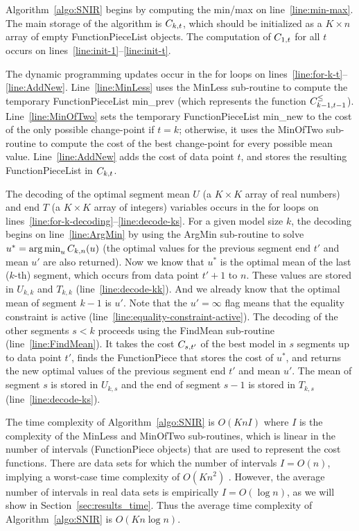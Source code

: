 \documentclass{article}
\DeclareMathOperator*{\argmin}{arg\,min}
\begin{document}
Algorithm~\ref{algo:SNIR} begins by computing the min/max on
line~\ref{line:min-max}.  The main storage of the algorithm is
$C_{k,t}$, which should be initialized as a $K\times n$ array of
empty FunctionPieceList objects. The computation of $C_{1,t}$ for
all $t$ occurs on lines~\ref{line:init-1}--\ref{line:init-t}. 

The dynamic programming updates occur in the for loops on
lines~\ref{line:for-k-t}--\ref{line:AddNew}. Line~\ref{line:MinLess}
uses the MinLess sub-routine to compute the temporary
FunctionPieceList min\_prev (which represents the function
$C_{k-1,t-1}^\leq$). Line~\ref{line:MinOfTwo} sets the temporary
FunctionPieceList min\_new to the cost of the only possible
change-point if $t=k$; otherwise, it uses the MinOfTwo sub-routine to
compute the cost of the best change-point for every possible mean
value. Line~\ref{line:AddNew} adds the cost of data point $t$, and
stores the resulting FunctionPieceList in $C_{k,t}$.

The decoding of the optimal segment mean $U$ (a $K\times K$ array of
real numbers) and end $T$ (a $K\times K$ array of integers) variables
occurs in the for loops on
lines~\ref{line:for-k-decoding}--\ref{line:decode-ks}. For a given
model size $k$, the decoding begins on line~\ref{line:ArgMin} by using
the ArgMin sub-routine to solve $u^* = \argmin_u \FCC_{k,n}(u)$ (the
optimal values for the previous segment end $t'$ and mean $u'$ are
also returned). Now we know that $u^*$ is the optimal mean of the last
($k$-th) segment, which occurs from data point $t'+1$ to $n$. These
values are stored in $U_{k,k}$ and $T_{k,k}$
(line~\ref{line:decode-kk}). And we already know that the optimal mean
of segment $k-1$ is $u'$.  Note that the $u'=\infty$ flag means that
the equality constraint is active
(line~\ref{line:equality-constraint-active}). The decoding of the
other segments $s<k$ proceeds using the FindMean sub-routine
(line~\ref{line:FindMean}). It takes the cost $C_{s,t'}$ of the
best model in $s$ segments up to data point $t'$, finds the
FunctionPiece that stores the cost of $u^*$, and returns the new
optimal values of the previous segment end $t'$ and mean $u'$. The
mean of segment $s$ is stored in $U_{k,s}$ and the end of segment
$s-1$ is stored in $T_{k,s}$ (line~\ref{line:decode-ks}).

The time complexity of Algorithm~\ref{algo:SNIR} is $O(K n I)$ where
$I$ is the complexity of the MinLess and MinOfTwo sub-routines, which
is linear in the number of intervals (FunctionPiece objects) that are
used to represent the cost functions. There are data sets for which
the number of intervals $I=O(n)$, implying a worst-case time complexity of $O(K n^2)$
\citep{pruned-dp}. However, the average number of intervals in real
data sets is empirically $I=O(\log n)$, as we will show in
Section~\ref{sec:results_time}. Thus the average time complexity of
Algorithm~\ref{algo:SNIR} is $O(K n \log n)$.
\end{document}
